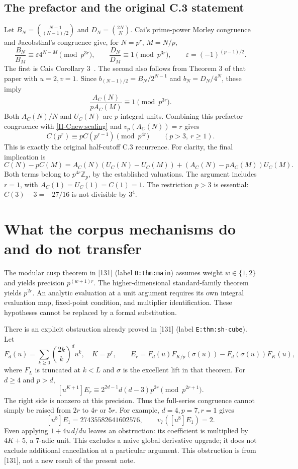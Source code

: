 \documentclass[11pt,letterpaper]{article}
\numberwithin{equation}{section}
\begin{document}
\subsection{The prefactor and the original C.3 statement}
Let $B_N=\binom{N-1}{(N-1)/2}$ and $D_N=\binom{2N}{N}$.
Cai's prime-power Morley congruence and Jacobsthal's congruence give,
for $N=p^r$, $M=N/p$,
\[
 \frac{B_N}{B_M}\equiv\varepsilon4^{N-M}\pmod{p^{3r}},
 \qquad \frac{D_N}{D_M}\equiv1\pmod{p^{3r}},
 \qquad\varepsilon=(-1)^{(p-1)/2}.
\]
The first is Cai\textquotesingle s Corollary 3~\cite{II-Cai2002}.
The second also follows from Theorem 3 of that paper with $u=2,v=1$.
Since $b_{(N-1)/2}=B_N/2^{N-1}$ and $b_N=D_N/4^N$, these imply
\[
 \frac{A_C(N)}{pA_C(M)}\equiv1\pmod{p^{3r}}.
\]
Both $A_C(N)/N$ and $U_C(N)$ are $p$-integral units. Combining this
prefactor congruence with \eqref{II-Cnew:scaling} and $v_p(A_C(N))=r$ gives
\[
 \boxed{C(p^r)\equiv pC(p^{r-1})\pmod{p^{4r}}\qquad(p>3,\ r\ge1).}
\]
This is exactly the original half-cutoff C.3 recurrence. For clarity,
the final implication is
\[
C(N)-pC(M)=A_C(N)(U_C(N)-U_C(M))
 +(A_C(N)-pA_C(M))U_C(M).
\]
Both terms belong to $p^{4r}\mathbb Z_p$, by the established valuations.
The argument includes $r=1$, with $A_C(1)=U_C(1)=C(1)=1$.
The restriction $p>3$ is essential: $C(3)-3=-27/16$ is not divisible
by $3^4$.
\section{What the corpus mechanisms do and do not transfer}\label{loc-II-5}
The modular cusp theorem in [131] (label \texttt{B:thm:main}) assumes
weight $w\in\{1,2\}$ and yields precision $p^{(w+1)r}$.
The higher-dimensional standard-family theorem yields $p^{2r}$.
An analytic evaluation at a unit argument requires its own integral
evaluation map, fixed-point condition, and multiplier identification.
These hypotheses cannot be replaced by a formal substitution.

There is an explicit obstruction already proved in [131]
(label \texttt{E:thm:sh-cube}). Let
\[
 F_d(u)=\sum_{k\ge0}\binom{2k}{k}^du^k,\quad K=p^r,\qquad
 E_r=F_d(u)F_{K/p}(\sigma(u))-F_d(\sigma(u))F_K(u),
\]
where $F_L$ is truncated at $k<L$ and $\sigma$ is the excellent lift
in that theorem. For $d\ge4$ and $p>d$,
\[
 [u^{K+1}]E_r\equiv2^{2d-1}d(d-3)p^{2r}\pmod{p^{2r+1}}.
\]
The right side is nonzero at this precision. Thus the full-series
congruence cannot simply be raised from $2r$ to $4r$ or $5r$.
For example, $d=4,p=7,r=1$ gives
\[
 [u^8]E_1=27435582641602576,\qquad v_7([u^8]E_1)=2.
\]
Even applying $1+4u\,d/du$ leaves an obstruction: its coefficient is
multiplied by $4K+5$, a $7$-adic unit. This excludes a naive global
derivative upgrade; it does not exclude additional cancellation at a
particular argument. This obstruction is from [131], not a new result
of the present note.
\end{document}
